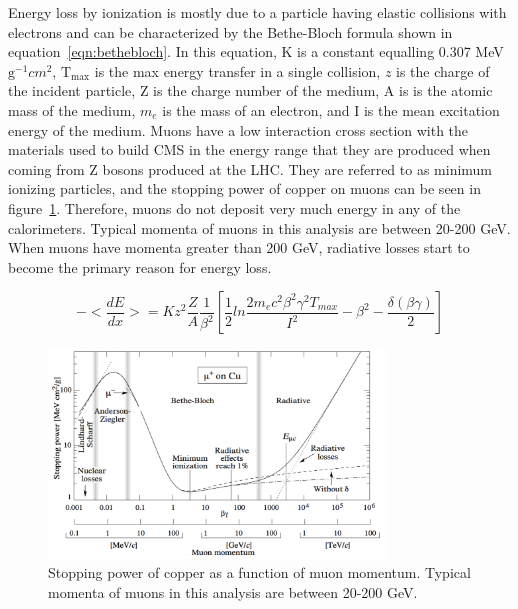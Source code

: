 Energy loss by ionization is mostly due to a particle having elastic collisions with electrons and can be characterized by the Bethe-Bloch formula shown in equation~\ref{eqn:bethebloch}.
In this equation, K is a constant equalling 0.307 MeV $\mathrm{g^{-1}}cm^{2}$,
$\mathrm{T_{max}}$ is the max energy transfer in a single collision,
$z$ is the charge of the incident particle,
Z is the charge number of the medium,
A is is the atomic mass of the medium,
$m_{e}$ is the mass of an electron,
and I is the mean excitation energy of the medium.
Muons have a low interaction cross section with the materials used to build CMS in the energy range that they are produced when coming from Z bosons produced at the LHC.
They are referred to as minimum ionizing particles, and the stopping power of copper on muons can be seen in figure~\ref{fig:muonenergyloss}.
Therefore, muons do not deposit very much energy in any of the calorimeters.
Typical momenta of muons in this analysis are between 20-200 GeV.
When muons have momenta greater than 200 GeV, radiative losses start to become the primary reason for energy loss.

\begin{equation}
  \label{eqn:bethebloch}
-<\frac{dE}{dx}> = Kz^{2}\frac{Z}{A}\frac{1}{\beta^{2}}[\frac{1}{2}ln\frac{2m_{e}c^{2}\beta^{2}\gamma^{2}T_{max}}{I^{2}}-\beta^{2}-\frac{\delta(\beta\gamma)}{2}]
\end{equation}

\begin{figure}[!htb]
  \begin{center}
    \includegraphics[width=0.8\textwidth]{cms/figs/muon_energy_loss.pdf}
    \caption{
      \label{fig:muonenergyloss}
      Stopping power of copper as a function of muon momentum. Typical momenta of muons in this analysis are between 20-200 GeV.
    }
  \end{center}
\end{figure}

